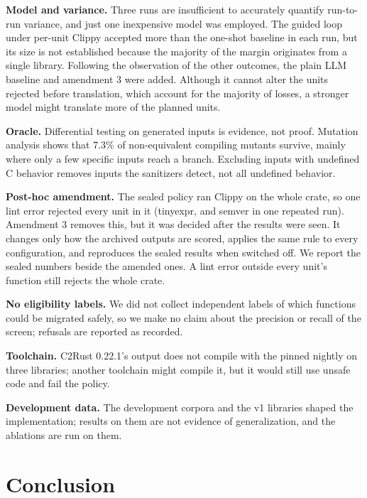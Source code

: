 \documentclass[pdflatex,sn-basic]{sn-jnl}
\begin{document}
\textbf{Model and variance.} Three runs are insufficient to accurately quantify 
run-to-run variance, and just one inexpensive model was employed. The guided 
loop under per-unit Clippy accepted more than the one-shot baseline in each run, 
but its size is not established because the majority of the margin originates from a 
single library. Following the observation of the other outcomes, the plain LLM baseline 
and amendment 3 were added. Although it cannot alter the units rejected before translation, 
which account for the majority of losses, a stronger model might translate more of the planned 
units. 

\textbf{Oracle.} Differential testing on generated inputs is evidence, not
proof. Mutation analysis shows that 7.3\% of non-equivalent compiling mutants
survive, mainly where only a few specific inputs reach a branch. Excluding inputs with undefined C
behavior removes inputs the sanitizers detect, not all undefined behavior.

\textbf{Post-hoc amendment.} The sealed policy ran Clippy on the whole crate,
so one lint error rejected every unit in it (tinyexpr, and semver in one
repeated run). Amendment 3 removes this, but it was decided after the results
were seen. It changes only how the archived outputs are scored, applies the
same rule to every configuration, and reproduces the sealed results when
switched off. We report the sealed numbers beside the amended ones. A lint
error outside every unit's function still rejects the whole crate.

\textbf{No eligibility labels.} We did not collect independent labels of
which functions could be migrated safely, so we make no claim about the
precision or recall of the screen; refusals are reported as recorded.

\textbf{Toolchain.} C2Rust 0.22.1's output does not compile with the pinned
nightly on three libraries; another toolchain might compile it, but it would
still use unsafe code and fail the policy.

\textbf{Development data.} The development corpora and the v1 libraries
shaped the implementation; results on them are not evidence of
generalization, and the ablations are run on them.

\section{Conclusion}
\end{document}
